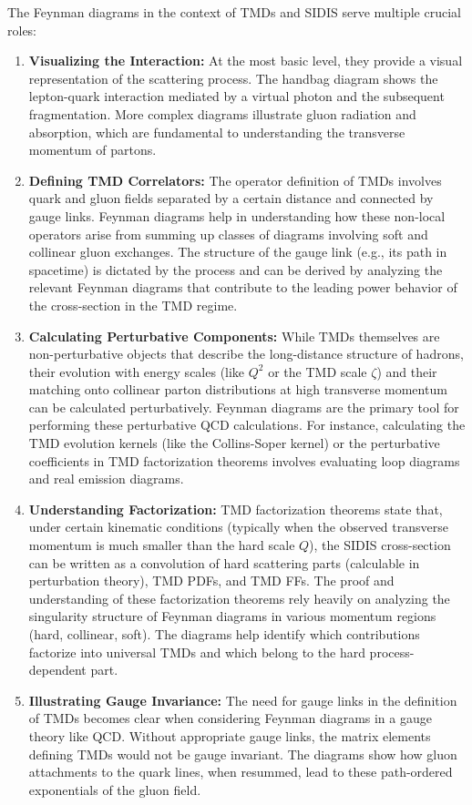 \documentclass[11pt]{article}
\begin{document}
The Feynman diagrams in the context of TMDs and SIDIS serve multiple crucial roles:
\begin{enumerate}
  \item \textbf{Visualizing the Interaction:} At the most basic level, they provide a visual representation of the scattering process. The handbag diagram shows the lepton-quark interaction mediated by a virtual photon and the subsequent fragmentation. More complex diagrams illustrate gluon radiation and absorption, which are fundamental to understanding the transverse momentum of partons.
  \item \textbf{Defining TMD Correlators:} The operator definition of TMDs involves quark and gluon fields separated by a certain distance and connected by gauge links. Feynman diagrams help in understanding how these non-local operators arise from summing up classes of diagrams involving soft and collinear gluon exchanges. The structure of the gauge link (e.g., its path in spacetime) is dictated by the process and can be derived by analyzing the relevant Feynman diagrams that contribute to the leading power behavior of the cross-section in the TMD regime.
  \item \textbf{Calculating Perturbative Components:} While TMDs themselves are non-perturbative objects that describe the long-distance structure of hadrons, their evolution with energy scales (like $Q^2$ or the TMD scale $\zeta$) and their matching onto collinear parton distributions at high transverse momentum can be calculated perturbatively. Feynman diagrams are the primary tool for performing these perturbative QCD calculations. For instance, calculating the TMD evolution kernels (like the Collins-Soper kernel) or the perturbative coefficients in TMD factorization theorems involves evaluating loop diagrams and real emission diagrams.
  \item \textbf{Understanding Factorization:} TMD factorization theorems state that, under certain kinematic conditions (typically when the observed transverse momentum is much smaller than the hard scale $Q$), the SIDIS cross-section can be written as a convolution of hard scattering parts (calculable in perturbation theory), TMD PDFs, and TMD FFs. The proof and understanding of these factorization theorems rely heavily on analyzing the singularity structure of Feynman diagrams in various momentum regions (hard, collinear, soft). The diagrams help identify which contributions factorize into universal TMDs and which belong to the hard process-dependent part.
  \item \textbf{Illustrating Gauge Invariance:} The need for gauge links in the definition of TMDs becomes clear when considering Feynman diagrams in a gauge theory like QCD. Without appropriate gauge links, the matrix elements defining TMDs would not be gauge invariant. The diagrams show how gluon attachments to the quark lines, when resummed, lead to these path-ordered exponentials of the gluon field.
\end{enumerate}
\end{document}

